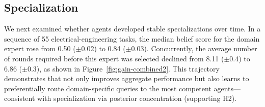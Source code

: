 \begin{table}[t]
\centering
\caption{Efficiency comparison at matched task success. Tokens, Agent Calls, and Time-to-Success are reported as ratios normalized to Random Delegation; lower is better.}
\label{table:results}
\end{table}


\begin{table}[t]
\centering
\caption{Routing behavior with and without belief updates (mean $\pm$ 95\% CI).}
\label{table:routing_behavior}
\end{table}


\subsection{Specialization}
We next examined whether agents developed stable specializations over time. In a sequence of 55 electrical-engineering tasks, the median belief score for the domain expert rose from 0.50 ($\pm$0.02) to 0.84 ($\pm$0.03). Concurrently, the average number of rounds required before this expert was selected declined from 8.11 ($\pm$0.4) to 6.86 ($\pm$0.3), as shown in Figure~\ref{fig:gain-combined2}. This trajectory demonstrates that \method{} not only improves aggregate performance but also learns to preferentially route domain-specific queries to the most competent agents---consistent with specialization via posterior concentration (supporting H2).



